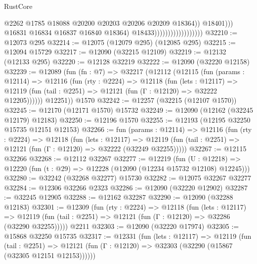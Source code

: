 \begin{lexlean}{RustCore}
\begin{coremodule}
                                                    @2262
                                                    @1785
                                                    @18088
                                                    @20200
                                                    @20203
                                                    @20206
                                                    @20209
                                                    @18364))
                                                @18401)))
                                          @16831
                                          @16834
                                          @16837
                                          @16840
                                          @18364)
                                        @18433))))))))))))))))))
@32210 := @12073 @295
@32214 := @12075 (@12079 @295) (@12085 @295)
@32215 := @12094 @15729
@32217 := @12090 (@32215 @12109)
@32219 := @12132 (@12133 @295)
@32220 := @12128 @32219
@32222 := @12090 (@32220 @12158)
@32239 := @12089
    (fun (fn : @7) =>
    @32217
      (@12112
        (@12115
          (fun (params : @12114) =>
          @12116
            (fun (rty : @2224) =>
            @12118
              (fun (lets : @12117) =>
              @12119 (fun (tail : @2251) => @12121 (fun (Γ : @12120) => @32222 @12205))))))
        @12251))
    @1570
@32242 := @12257 (@32215 (@12107 @1570))
@32245 := @12170 (@12171 @1570) @15732
@32249 := @12090 (@12162 (@32245 @12179) @12183)
@32250 := @12196 @1570
@32255 := @12193 (@12195 @32250 @15735 @12151 @12153)
@32266 := fun (params : @12114) =>
  @12116
    (fun (rty : @2224) =>
    @12118
      (fun (lets : @12117) =>
      @12119 (fun (tail : @2251) => @12121 (fun (Γ : @12120) => @32222 (@32249 @32255)))))
@32267 := @12115 @32266
@32268 := @12112 @32267
@32277 := @12219
    (fun (U : @12218) => @12220 (fun (t : @29) => @12228 (@12090 (@12234 @15732 @12108) @12245)))
@32280 := @32242 (@32268 @32277) @15730
@32282 := @12075 @32267 @32277
@32284 := @12306 @32266 @2323
@32286 := @12090 (@32220 @12902)
@32287 := @32245 @12905
@32288 := @12162 @32287
@32290 := @12090 (@32288 @12183)
@32301 := @12309
    (fun (rty : @2224) =>
    @12118
      (fun (lets : @12117) =>
      @12119 (fun (tail : @2251) => @12121 (fun (Γ : @12120) => @32286 (@32290 @32255)))))
    @2211
@32303 := @12090 (@32220 @17974)
@32305 := @15868 @32250 @15735
@32317 := @12331
    (fun (lets : @12117) =>
    @12119
      (fun (tail : @2251) =>
      @12121 (fun (Γ : @12120) => @32303 (@32290 (@15867 (@32305 @12151 @12153))))))

\end{coremodule}
\end{lexlean}
